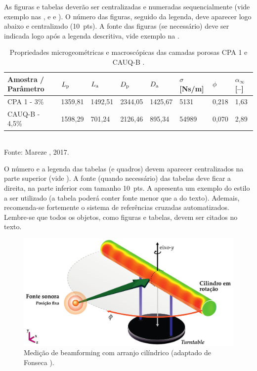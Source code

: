 \documentclass[12pt, a4paper, oneside, onecolumn] {article}%
\begin{document}
As figuras e tabelas deverão ser centralizadas e numeradas sequencialmente (vide exemplo nas ,  e  e ). O número das figuras, seguido da legenda, deve aparecer logo abaixo e centralizado (10~pts). A fonte das figuras (se necessário) deve ser indicada logo após a legenda descritiva, vide exemplo na .

\begin{table}[H]
  \centering {} 
  \caption{Propriedades microgeométricas e macroscópicas das camadas porosas CPA 1 e CAUQ-B \cite{Mareze-2017}.}
	\fontsize{11}{12}\selectfont 
    \begin{tabular}{C{2.8cm} | C{1.5cm} | C{1.5cm} | C{1.5cm} | C{1.5cm} | C{1.5cm} | C{1.0cm}| C{1.0cm}}
    \toprule
    \textbf{ Amostra / Parâmetro } & $L_{\text{p}}$ \qquad [$\upmu$\! m] & $L_{\text{a}}$ \qquad [$\upmu$\! m] & $D_{\text{p}}$ \qquad [$\upmu$\! m] & $D_{\text{a}}$ \qquad [$\upmu$\! m] & $\sigma$ [Ns/m] & {$\phi$\quad [--]} & $\alpha_{\infty}$ [--]\\
	  \midrule
		CPA 1 -  3\% &	1359,81 & 1492,51 & 2344,05 & 1425,67 &	5131 &	0,218 &	1,63\\
		 CAUQ-B - 4,5\%	& 1598,29 &	701,24 & 2126,46 & 895,34 &	54989 &	0,070 &	2,89\\
    \bottomrule
    \end{tabular}\\[4pt]
		\noindent \hfill \footnotesize
		Fonte: Mareze \etal, 2017.
		\vspace{-0.8\intextsep} %
    \label{tab.exemplo}%
\end{table}%

O número e a legenda das tabelas (e quadros) devem aparecer centralizados na parte superior (vide ). A fonte (quando necessário) das tabelas deve ficar a direita, na parte inferior com tamanho 10~pts. A  apresenta um exemplo do estilo a ser utilizado (a tabela poderá conter fonte menor que a do texto). Ademais, recomenda-se fortemente o sistema de referências cruzadas automatizados. Lembre-se que todos os objetos, como figuras e tabelas, devem ser citados no texto.

\begin{figure}[!ht]
	\centering
	\includegraphics[width=0.85\linewidth]{figuras/Measurement-Scheme-Fonseca-2013.pdf}%
	\caption{Medição de beamforming com arranjo cilíndrico (adaptado de Fonseca \cite{Fonseca-2013}).}%
	\label{fig:beamforming}%
\end{figure}
\end{document}
